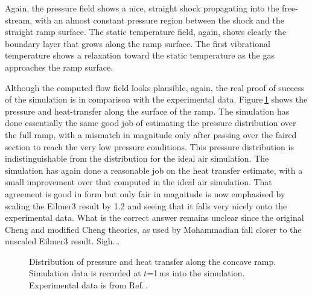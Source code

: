 \medskip
Again, the pressure field shows a nice, straight shock propagating into the free-stream, 
with an almost constant pressure region between the shock and the straight ramp surface.
The static temperature field, again, shows clearly the boundary layer that grows along the ramp surface.
The first vibrational temperature shows a relaxation toward the static temperature as the gas approaches 
the ramp surface.


\medskip
Although the computed flow field looks plausible, again,
the real proof of success of the simulation is in comparison with the experimental data.
Figure\,\ref{fig:convex-ramp-noneq-data-compare} shows the pressure and heat-transfer
along the surface of the ramp.
The simulation has done essentially the same good job of estimating the pressure distribution over the full ramp,
with a mismatch in magnitude only after passing over the faired section to reach the 
very low pressure conditions.
This pressure distribution is indistinguishable from the distribution for the ideal air simulation.
The simulation has again done a reasonable job on the heat transfer estimate,
with a small improvement over that computed in the ideal air simulation.
That agreement is good in form but only fair in magnitude is now emphasised by scaling the Eilmer3 result
by 1.2 and seeing that it falls very nicely onto the experimental data.
What is the correct answer remains unclear since the original Cheng and modified Cheng theories, 
as used by Mohammadian fall closer to the unscaled Eilmer3 result.  Sigh...

\begin{figure}[htbp]
 \centering
 \caption{Distribution of pressure and heat transfer along the concave ramp.
   Simulation data is recorded at $t$=1\,ms into the simulation.
   Experimental data is from Ref.\,\cite{mohammadian_1972a}.}
 \label{fig:convex-ramp-noneq-data-compare}
\end{figure}


